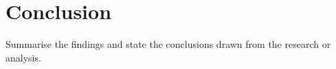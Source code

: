 \section{Conclusion}

Summarise the findings and state the conclusions drawn from the research or analysis.
